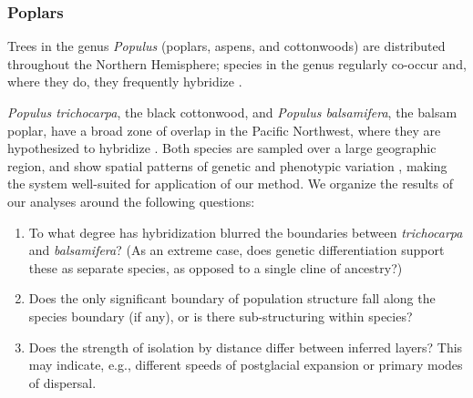 \documentclass[10pt,letterpaper]{article}
\begin{document}
\subsubsection*{Poplars}

Trees in the genus \textit{Populus} (poplars, aspens, and cottonwoods) 
are distributed throughout the Northern Hemisphere;
species in the genus regularly co-occur and, 
where they do, they frequently hybridize \cite{eckenwalder1984, Cronk2005}.

\textit{Populus trichocarpa}, the black cottonwood,
and \textit{Populus balsamifera}, the balsam poplar,
have a broad zone of overlap in the Pacific Northwest,
where they are hypothesized to hybridize \cite{geraldes_etal_2014, suarezgonzalez_etal_2016}.
Both species are sampled over a large geographic region, 
and show spatial patterns of genetic and phenotypic variation \cite{slavov_etal_2012, mckown_etal_2013},
making the system well-suited for application of our method.
We organize the results of our analyses around the following questions: 
\begin{enumerate}

    \item To what degree has hybridization blurred the boundaries between 
        \textit{trichocarpa} and \textit{balsamifera}?
        (As an extreme case, does genetic differentiation support these as separate species,
        as opposed to a single cline of ancestry?)

    \item Does the only significant boundary of population structure
        fall along the species boundary (if any),
        or is there sub-structuring within species?

    \item Does the strength of isolation by distance differ between inferred layers?
        This may indicate, e.g., different speeds of postglacial expansion
        or primary modes of dispersal.

\end{enumerate}
\end{document}
